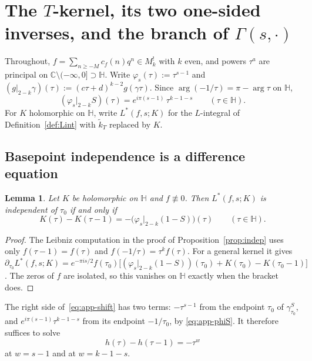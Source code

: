 \documentclass[11pt]{article}
\newtheorem{lemma}[theorem]{Lemma}
\newcommand{\HH}{\mathbb{H}}
\newcommand{\CC}{\mathbb{C}}
\newcommand{\tk}{\widetilde{k}_T}
\begin{document}
\appendix


\section{The $T$-kernel, its two one-sided inverses, and the branch of $\Gamma(s,\cdot)$}\label{app:branch}

Throughout, $f=\sum_{n\ge-M}c_f(n)q^n\in M^!_k$ with $k$ even, and powers $\tau^a$ are principal
on $\CC\setminus(-\infty,0]\supset\HH$. Write $\varphi_s(\tau):=\tau^{s-1}$ and
$(g|_{2-k}\gamma)(\tau):=(c\tau+d)^{k-2}g(\gamma\tau)$. Since $\arg(-1/\tau)=\pi-\arg\tau$ on $\HH$,
\begin{equation}\label{eq:app-phiS}
(\varphi_s|_{2-k}S)(\tau)=e^{i\pi(s-1)}\,\tau^{k-1-s}\qquad(\tau\in\HH).
\end{equation}
For $K$ holomorphic on $\HH$, write $L^*(f,s;K)$ for the $L$-integral of
Definition~\ref{def:Lint} with $\tk$ replaced by $K$.

\subsection{Basepoint independence is a difference equation}

\begin{lemma}\label{lem:app-shift}
Let $K$ be holomorphic on $\HH$ and $f\not\equiv0$. Then $L^*(f,s;K)$ is independent of $\tau_0$
if and only if
\begin{equation}\label{eq:app-shift}
K(\tau)-K(\tau-1)=-\big(\varphi_s|_{2-k}(1-S)\big)(\tau)\qquad(\tau\in\HH).
\end{equation}
\end{lemma}

\begin{proof}
The Leibniz computation in the proof of Proposition~\ref{prop:indep} uses only $f(\tau-1)=f(\tau)$
and $f(-1/\tau)=\tau^kf(\tau)$. For a general kernel it gives
$\partial_{\tau_0}L^*(f,s;K)=e^{-\pi is/2}f(\tau_0)\big[(\varphi_s|_{2-k}(1-S))(\tau_0)+K(\tau_0)-K(\tau_0-1)\big]$.
The zeros of $f$ are isolated, so this vanishes on $\HH$ exactly when the bracket does.
\end{proof}

The right side of~\eqref{eq:app-shift} has two terms: $-\tau^{s-1}$ from the endpoint $\tau_0$ of
$\gamma^S_{\tau_0}$, and $e^{i\pi(s-1)}\tau^{k-1-s}$ from its endpoint $-1/\tau_0$, by
\eqref{eq:app-phiS}. It therefore suffices to solve
\begin{equation}\label{eq:app-scalar}
h(\tau)-h(\tau-1)=-\tau^{w}
\end{equation}
at $w=s-1$ and at $w=k-1-s$.
\end{document}
